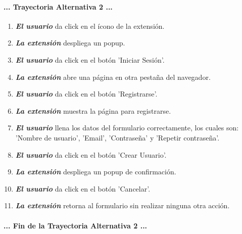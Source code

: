 \documentclass[12pt, a4paper, titlepage]{report}
\begin{document}
				
				\paragraph{... Trayectoria Alternativa 2 ...}
				\begin{enumerate}
				    
				    \item \textbf{\textit{El usuario}} da click en el ícono de la extensión.
				    
				    \item \textbf{\textit{La extensión}} despliega un popup.
					
					\item \textbf{\textit{El usuario}} da click en el botón 'Iniciar Sesión'.
					
					\item \textbf{\textit{La extensión}} abre una página en otra pestaña del navegador.
					
					\item \textbf{\textit{El usuario}} da click en el botón 'Registrarse'.
					
					\item \textbf{\textit{La extensión}} muestra la página para registrarse.
					
					\item \textbf{\textit{El usuario}} llena los datos del formulario correctamente, los cuales son: 'Nombre de usuario', 'Email', 'Contraseña' y 'Repetir contraseña'.
					
					\item \textbf{\textit{El usuario}} da click en el botón 'Crear Usuario'.
					
					\item \textbf{\textit{La extensión}} despliega un popup de confirmación.
					
					\item \textbf{\textit{El usuario}} da click en el botón 'Cancelar'.
					
			        \item \textbf{\textit{La extensión}} retorna al formulario sin realizar ninguna otra acción.
					
				\end{enumerate}
				\paragraph{... Fin de la Trayectoria Alternativa 2 ...}
				\newpage
\end{document}
